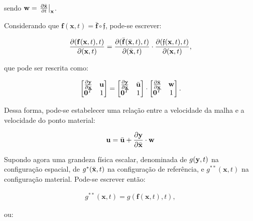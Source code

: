 \documentclass[tese_patricia]{subfiles}%
\begin{document}
\noindent sendo $\mathbf{w} = \left. \frac{\partial \bar{\mathbf{x}}}{\partial t} \right|_{\mathbf{x}}$.


Considerando que $\mathbf{f}\left(\mathbf{x},t\right) = \bar{\mathbf{f}} \circ \mathfrak{f}$, pode-se escrever:

\begin{align}
	\frac{\partial(\mathbf{f}(\mathbf{x},t),t)}{\partial(\mathbf{x},t)} = \frac{\partial(\bar{\mathbf{f}}(\bar{\mathbf{x}},t),t)}{\partial(\bar{\mathbf{x}},t)} \cdot \frac{\partial(\mathfrak{f}(\mathbf{x},t),t)}{\partial(\mathbf{x},t)},
\end{align}

\noindent que pode ser rescrita como:

\begin{align}
	\begin{bmatrix}
		\frac{\partial {\mathbf{y}}}{\partial {\mathbf{x}}} & \mathbf{u} \\
		\mathbf{0}^T & 1 \\
	\end{bmatrix}
	=
	\begin{bmatrix}
		\frac{\partial {\mathbf{y}}}{\partial {\bar{\mathbf{x}}}} & \bar{\mathbf{u}} \\
		\mathbf{0}^T & 1 \\
	\end{bmatrix}
	\cdot
	\begin{bmatrix}
		\frac{\partial {\bar{\mathbf{x}}}}{\partial {\mathbf{x}}} & \mathbf{w} \\
		\mathbf{0}^T & 1 \\
	\end{bmatrix} .
\end{align}

Dessa forma, pode-se estabelecer uma relação entre a velocidade da malha e a velocidade do ponto material:

\begin{align}
	\mathbf{u} = \bar{\mathbf{u}} + \frac{\partial{\mathbf{y}}}{\partial{\bar{\mathbf{x}}}}\cdot \mathbf{w} \label{eq:velRel}
\end{align}

Supondo agora uma grandeza física escalar, denominada de $g(\mathbf{y},t)$ na configuração espacial, de $g^{*}(\bar{\mathbf{x}},t)$ na configuração de referência, e $g^{**}(\mathbf{x},t)$ na configuração material. Pode-se escrever então:

\begin{align}
	g^{**}(\mathbf{x},t) = g(\mathbf{f}(\mathbf{x},t),t), 
\end{align}

\noindent ou:
\end{document}
